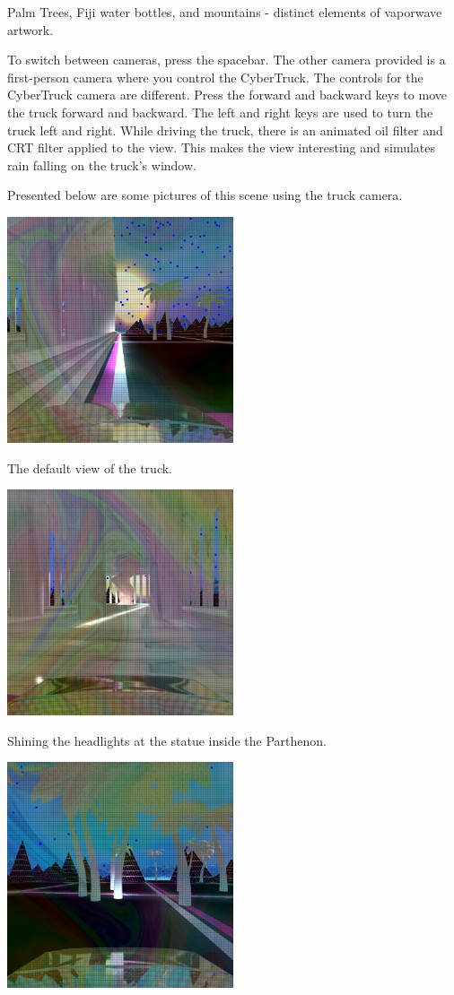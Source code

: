 \documentclass[10pt,letterpaper,oneside]{article}
\numberwithin{equation}{section}		%
\numberwithin{figure}{section}			%
\numberwithin{table}{section}				%
\begin{document}
\begin{center}
    Palm Trees, Fiji water bottles, and mountains - distinct elements of vaporwave artwork.
\end{center}

To switch between cameras, press the spacebar. The other camera provided is a first-person camera where you control the CyberTruck. The controls for the CyberTruck camera are different. Press the forward and backward keys to move the truck forward and backward. The left and right keys are used to turn the truck left and right. While driving the truck, there is an animated oil filter and CRT filter applied to the view. This makes the view interesting and simulates rain falling on the truck's window.

Presented below are some pictures of this scene using the truck camera.

\begin{center}
    \includegraphics[width=0.5\textwidth]{truck1.png}
    
    The default view of the truck.
    
    \includegraphics[width=0.5\textwidth]{truck2.png}
    
    Shining the headlights at the statue inside the Parthenon.
    
    \includegraphics[width=0.5\textwidth]{truck3.png}
    

\end{center}
\end{document}
